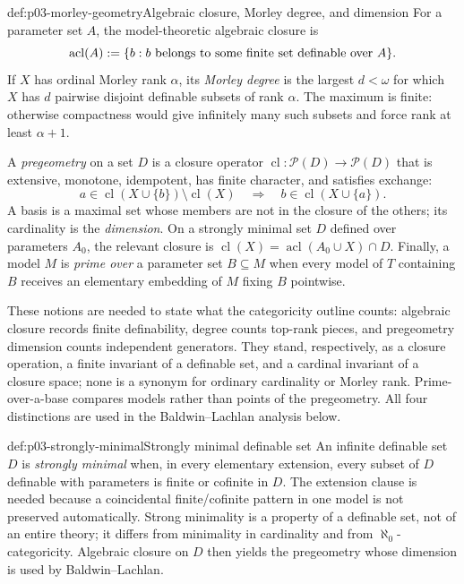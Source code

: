 \begin{hbdefinition}{def:p03-morley-geometry}{Algebraic closure, Morley degree, and dimension}
For a parameter set \(A\), the model-theoretic algebraic closure is
\[
 \operatorname{acl}(A)
 \mathrel{:=}\{b:b\text{ belongs to some finite set definable over }A\}.
\]
If \(X\) has ordinal Morley rank \(\alpha\), its \emph{Morley degree} is the
largest \(d<\omega\) for which \(X\) has \(d\) pairwise disjoint definable
subsets of rank \(\alpha\).  The maximum is finite: otherwise compactness
would give infinitely many such subsets and force rank at least
\(\alpha+1\).

A \emph{pregeometry} on a set \(D\) is a closure operator
\(\operatorname{cl}:\mathcal P(D)\to\mathcal P(D)\) that is extensive,
monotone, idempotent, has finite character, and satisfies exchange:
\[
 a\in\operatorname{cl}(X\cup\{b\})\setminus\operatorname{cl}(X)
 \quad\Longrightarrow\quad
 b\in\operatorname{cl}(X\cup\{a\}).
\]
A basis is a maximal set whose members are not in the closure of the others;
its cardinality is the \emph{dimension}.  On a strongly minimal set \(D\)
defined over parameters \(A_0\), the relevant closure is
\(\operatorname{cl}(X)=\operatorname{acl}(A_0\cup X)\cap D\).
Finally, a model \(M\) is \emph{prime over} a parameter set \(B\subseteq M\)
when every model of \(T\) containing \(B\) receives an elementary embedding
of \(M\) fixing \(B\) pointwise.

These notions are needed to state what the categoricity outline counts:
algebraic closure records finite definability, degree counts top-rank pieces,
and pregeometry dimension counts independent generators.  They stand,
respectively, as a closure operation, a finite invariant of a definable set,
and a cardinal invariant of a closure space; none is a synonym for ordinary
cardinality or Morley rank.  Prime-over-a-base compares models rather than
points of the pregeometry.  All four distinctions are used in the
Baldwin--Lachlan analysis below.
\end{hbdefinition}

\begin{hbdefinition}{def:p03-strongly-minimal}{Strongly minimal definable set}
An infinite definable set \(D\) is \emph{strongly minimal} when, in every
elementary extension, every subset of \(D\) definable with parameters is
finite or cofinite in \(D\).  The extension clause is needed because a
coincidental finite/cofinite pattern in one model is not preserved
automatically.  Strong minimality is a property of a definable set, not of an
entire theory; it differs from minimality in cardinality and from
\(\aleph_0\)-categoricity.  Algebraic closure on \(D\) then yields the
pregeometry whose dimension is used by Baldwin--Lachlan.
\end{hbdefinition}

